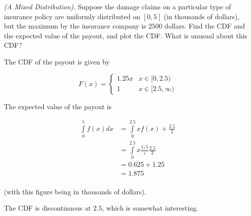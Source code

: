 \begin{problem}[Handout 12, \# 18]
  \emph{(A Mixed Distribution).} Suppose the damage claims on a particular
  type of insurance policy are uniformly distributed on \([0,5]\) (in
  thousands of dollars), but the maximum by the insurance company is
  \(2500\) dollars. Find the CDF and the expected value of the payout, and
  plot the CDF. What is unusual about this CDF?
\end{problem}
\begin{solution}
The CDF of the payout is given by

\[
F(x) =

\begin{cases}
      1.25x& x \in [0,2.5) \\
      1& x \in [2.5, \infty)
   \end{cases}
\]

The expected value of the payout is

\begin{align*}
\int\limits_0^5 f(x) dx &= \int\limits_0^{2.5} xf(x) + \frac{2.5}{2} \\
&= \int\limits_0^{2.5} x\frac{1/5} + \frac{2.5}{2} \\
&= 0.625 + 1.25 \\
&= 1.875 \\
\end{align*}

(with this figure being in thousands of dollars).

The CDF is discontinuous at $2.5$, which is somewhat interesting.

\end{solution}
\newpage

